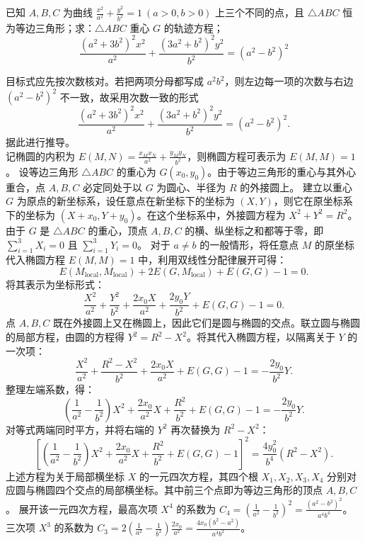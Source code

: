 \begin{example}
已知 $A, B, C$ 为曲线 $\frac{x^2}{a^2} + \frac{y^2}{b^2} = 1\ (a > 0, b > 0)$ 上三个不同的点，且 $\triangle ABC$ 恒为等边三角形；求：$\triangle ABC$ 重心 $G$ 的轨迹方程；
\[
\frac{(a^2 + 3b^2)^2 x^2}{a^2} + \frac{(3a^2 + b^2)^2 y^2}{b^2} = (a^2 - b^2)^2
\]
\end{example}
\begin{solution}
目标式应先按次数核对。若把两项分母都写成 $a^2b^2$，则左边每一项的次数与右边 $(a^2-b^2)^2$ 不一致，故采用次数一致的形式
\[
\frac{(a^2 + 3b^2)^2 x^2}{a^2} + \frac{(3a^2 + b^2)^2 y^2}{b^2} = (a^2 - b^2)^2.
\]
据此进行推导。\\
记椭圆的内积为 $E(M, N) = \frac{x_M x_N}{a^2} + \frac{y_M y_N}{b^2}$，则椭圆方程可表示为 $E(M, M) = 1$。
设等边三角形 $\triangle ABC$ 的重心为 $G(x_0, y_0)$。由于等边三角形的重心与其外心重合，点 $A, B, C$ 必定同处于以 $G$ 为圆心、半径为 $R$ 的外接圆上。
建立以重心 $G$ 为原点的新坐标系，设任意点在新坐标下的坐标为 $(X, Y)$，则它在原坐标系下的坐标为 $(X+x_0, Y+y_0)$。在这个坐标系中，外接圆方程为 $X^2 + Y^2 = R^2$。由于 $G$ 是 $\triangle ABC$ 的重心，顶点 $A, B, C$ 的横、纵坐标之和都等于零，即 $\sum_{i=1}^3 X_i = 0$ 且 $\sum_{i=1}^3 Y_i = 0$。
对于 $a \neq b$ 的一般情形，将任意点 $M$ 的原坐标代入椭圆方程 $E(M, M) = 1$ 中，利用双线性分配律展开可得：
\[ E(M_{\text{local}}, M_{\text{local}}) + 2E(G, M_{\text{local}}) + E(G, G) - 1 = 0. \]
将其表示为坐标形式：
\[ \frac{X^2}{a^2} + \frac{Y^2}{b^2} + \frac{2x_0 X}{a^2} + \frac{2y_0 Y}{b^2} + E(G,G) - 1 = 0. \]
点 $A, B, C$ 既在外接圆上又在椭圆上，因此它们是圆与椭圆的交点。联立圆与椭圆的局部方程，由圆的方程得 $Y^2 = R^2 - X^2$。将其代入椭圆方程，以隔离关于 $Y$ 的一次项：
\[ \frac{X^2}{a^2} + \frac{R^2 - X^2}{b^2} + \frac{2x_0 X}{a^2} + E(G,G) - 1 = - \frac{2y_0}{b^2} Y. \]
整理左端系数，得：
\[ \left( \frac{1}{a^2} - \frac{1}{b^2} \right) X^2 + \frac{2x_0}{a^2} X + \frac{R^2}{b^2} + E(G,G) - 1 = - \frac{2y_0}{b^2} Y. \]
对等式两端同时平方，并将右端的 $Y^2$ 再次替换为 $R^2 - X^2$：
\[ \left[ \left( \frac{1}{a^2} - \frac{1}{b^2} \right) X^2 + \frac{2x_0}{a^2} X + \frac{R^2}{b^2} + E(G,G) - 1 \right]^2 = \frac{4y_0^2}{b^4} (R^2 - X^2). \]
上述方程为关于局部横坐标 $X$ 的一元四次方程，其四个根 $X_1, X_2, X_3, X_4$ 分别对应圆与椭圆四个交点的局部横坐标。其中前三个点即为等边三角形的顶点 $A, B, C$。
展开该一元四次方程，最高次项 $X^4$ 的系数为 $C_4 = \left( \frac{1}{a^2} - \frac{1}{b^2} \right)^2 = \frac{(a^2 - b^2)^2}{a^4 b^4}$。
三次项 $X^3$ 的系数为 $C_3 = 2 \left( \frac{1}{a^2} - \frac{1}{b^2} \right) \frac{2x_0}{a^2} = \frac{4x_0 (b^2 - a^2)}{a^4 b^2}$。

\end{solution}
